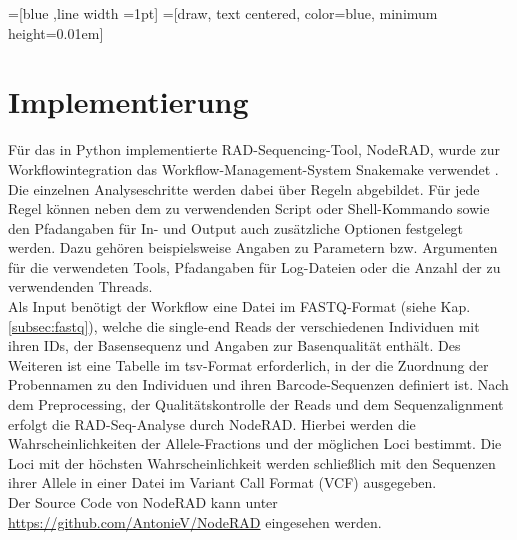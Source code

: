 =[blue ,line  width =1pt]
=[draw, text centered, color=blue, minimum height=0.01em]
\newcommand{\fun}[3]{%
	\path [dashedline] (#1.east) -- node [above]
	{\scriptsize #2} (#3);}
\chapter{Implementierung} \label{sec:alg}
Für das in Python implementierte RAD-Sequencing-Tool, NodeRAD, wurde zur Workflowintegration das Workflow-Management-System Snakemake verwendet \cite{koester_2012_1, koester_2012_2}. Die einzelnen Analyseschritte werden dabei über Regeln abgebildet. Für jede Regel können neben dem zu verwendenden Script oder Shell-Kommando sowie den Pfadangaben für In- und Output auch zusätzliche Optionen festgelegt werden. Dazu gehören beispielsweise Angaben zu Parametern bzw. Argumenten für die verwendeten Tools, Pfadangaben für Log-Dateien oder die Anzahl der zu verwendenden Threads. \\

Als Input benötigt der Workflow eine Datei im FASTQ-Format (siehe Kap. \ref{subsec:fastq}), welche die single-end Reads der verschiedenen Individuen mit ihren IDs, der Basensequenz und Angaben zur Basenqualität enthält. Des Weiteren ist eine Tabelle im tsv-Format erforderlich, in der die Zuordnung der Probennamen zu den Individuen und ihren Barcode-Sequenzen definiert ist. Nach dem Preprocessing, der Qualitätskontrolle der Reads und dem Sequenzalignment erfolgt die RAD-Seq-Analyse durch NodeRAD. Hierbei werden die Wahrscheinlichkeiten der Allele-Fractions und der möglichen Loci bestimmt. Die Loci mit der höchsten Wahrscheinlichkeit werden schließlich mit den Sequenzen ihrer Allele in einer Datei im Variant Call Format (VCF) ausgegeben.\\

Der Source Code von NodeRAD kann unter \href{https://github.com/AntonieV/NodeRAD}{https://github.com/AntonieV/NodeRAD} eingesehen werden.

